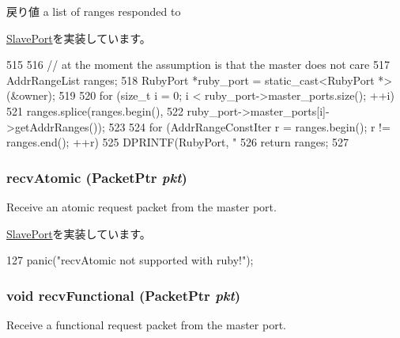 \begin{DoxyReturn}{戻り値}
a list of ranges responded to 
\end{DoxyReturn}


\hyperlink{classSlavePort_a6e967f8921e80748eb2be35b6b481a7e}{SlavePort}を実装しています。


\begin{DoxyCode}
515 {
516     // at the moment the assumption is that the master does not care
517     AddrRangeList ranges;
518     RubyPort *ruby_port = static_cast<RubyPort *>(&owner);
519 
520     for (size_t i = 0; i < ruby_port->master_ports.size(); ++i) {
521         ranges.splice(ranges.begin(),
522                 ruby_port->master_ports[i]->getAddrRanges());
523     }
524     for (AddrRangeConstIter r = ranges.begin(); r != ranges.end(); ++r)
525         DPRINTF(RubyPort, "%
526     return ranges;
527 }
\end{DoxyCode}
\hypertarget{classRubyPort_1_1PioSlavePort_a5f0b4c4a94f6b0053f9d7a4eb9c2518a}{
\subsubsection[{recvAtomic}]{ recvAtomic ({\bf PacketPtr} {\em pkt})}}
\label{classRubyPort_1_1PioSlavePort_a5f0b4c4a94f6b0053f9d7a4eb9c2518a}
Receive an atomic request packet from the master port. 

\hyperlink{classSlavePort_a428ab07671bc9372dc44a2487b12a726}{SlavePort}を実装しています。


\begin{DoxyCode}
127         { panic("recvAtomic not supported with ruby!"); }
\end{DoxyCode}
\hypertarget{classRubyPort_1_1PioSlavePort_aeefa907fb6d6a787e6dab90e8138ea90}{
\subsubsection[{recvFunctional}]{\setlength{\rightskip}{0pt plus 5cm}void recvFunctional ({\bf PacketPtr} {\em pkt})}}
\label{classRubyPort_1_1PioSlavePort_aeefa907fb6d6a787e6dab90e8138ea90}
Receive a functional request packet from the master port. 

